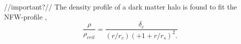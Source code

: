 //important?//
The density profile of a dark matter halo is found to fit the NFW-profile \parencite{Navarro1996},
\begin{equation}
    \frac{\rho}{\rho_{crit}} = \frac{\delta_c}{(r/r_c)(+1+r/r_s)^2.}
\end{equation}